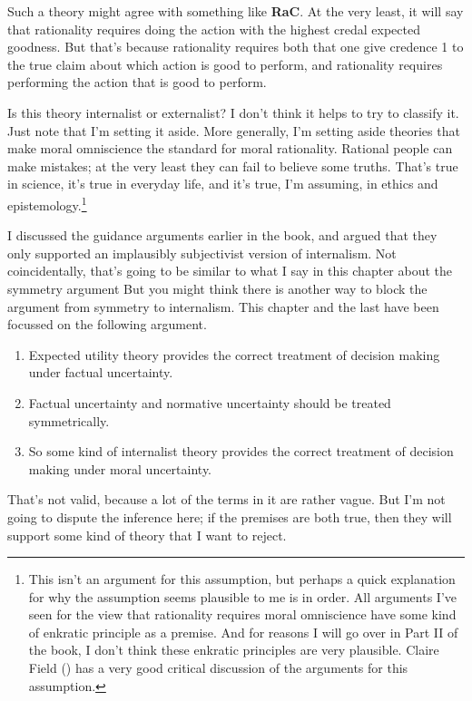 \documentclass[
  10pt,
  letterpaper,
  twoside]{scrbook}
\providecommand{\tightlist}{%
  \setlength{\itemsep}{0pt}\setlength{\parskip}{0pt}}\usepackage{longtable,booktabs,array}
\begin{document}
Such a theory might agree with something like \textbf{RaC}. At the very
least, it will say that rationality requires doing the action with the
highest credal expected goodness. But that's because rationality
requires both that one give credence 1 to the true claim about which
action is good to perform, and rationality requires performing the
action that is good to perform.

Is this theory internalist or externalist? I don't think it helps to try
to classify it. Just note that I'm setting it aside. More generally, I'm
setting aside theories that make moral omniscience the standard for
moral rationality. Rational people can make mistakes; at the very least
they can fail to believe some truths. That's true in science, it's true
in everyday life, and it's true, I'm assuming, in ethics and
epistemology.\footnote{This isn't an argument for this assumption, but
  perhaps a quick explanation for why the assumption seems plausible to
  me is in order. All arguments I've seen for the view that rationality
  requires moral omniscience have some kind of enkratic principle as a
  premise. And for reasons I will go over in Part II of the book, I
  don't think these enkratic principles are very plausible. Claire Field
  () has a very good critical
  discussion of the arguments for this assumption.}

I discussed the guidance arguments earlier in the book, and argued that
they only supported an implausibly subjectivist version of internalism.
Not coincidentally, that's going to be similar to what I say in this
chapter about the symmetry argument But you might think there is another
way to block the argument from symmetry to internalism. This chapter and
the last have been focussed on the following argument.

\begin{enumerate}
\def\labelenumi{\arabic{enumi}.}
\tightlist
\item
  Expected utility theory provides the correct treatment of decision
  making under factual uncertainty.
\item
  Factual uncertainty and normative uncertainty should be treated
  symmetrically.
\item
  So some kind of internalist theory provides the correct treatment of
  decision making under moral uncertainty.
\end{enumerate}

That's not valid, because a lot of the terms in it are rather vague. But
I'm not going to dispute the inference here; if the premises are both
true, then they will support some kind of theory that I want to reject.
\end{document}
